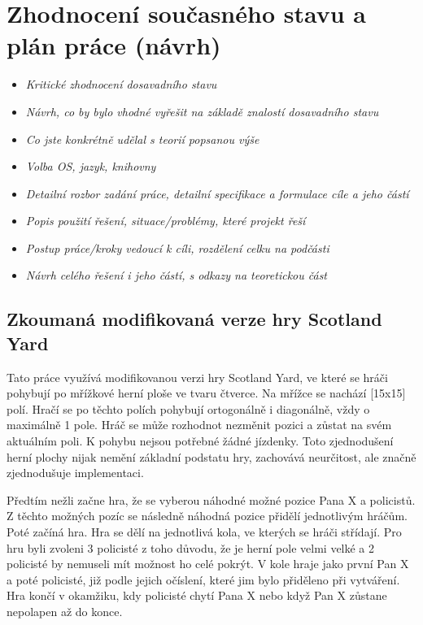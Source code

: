 \chapter{Zhodnocení současného stavu a plán práce (návrh)}
\label{ch:navrh}
\begin{itemize}
  \item \emph {Kritické zhodnocení dosavadního stavu}
  \item \emph {Návrh, co by bylo vhodné vyřešit na základě znalostí dosavadního stavu}
  \item \emph {Co jste konkrétně udělal s teorií popsanou výše}
  \item \emph {Volba OS, jazyk, knihovny}
  \item \emph {Detailní rozbor zadání práce, detailní specifikace a formulace cíle a jeho částí}
  \item \emph {Popis použití řešení, situace/problémy, které projekt řeší}
  \item \emph {Postup práce/kroky vedoucí k cíli, rozdělení celku na podčásti}
  \item \emph {Návrh celého řešení i jeho částí, s odkazy na teoretickou část}
\end{itemize}

\section*{Zkoumaná modifikovaná verze hry Scotland Yard}

Tato práce využívá modifikovanou verzi hry Scotland Yard, ve které se hráči pohybují po mřížkové herní ploše ve tvaru čtverce.
Na mřížce se nachází {\color{red}[15x15]} polí.
Hračí se po těchto polích pohybují ortogonálně i diagonálně, vždy o maximálně 1 pole.
Hráč se může rozhodnot nezměnit pozici a zůstat na svém aktuálním poli.
K pohybu nejsou potřebné žádné jízdenky.
Toto zjednodušení herní plochy nijak nemění základní podstatu hry, zachovává neurčitost, ale značně zjednodušuje implementaci.

Předtím nežli začne hra, že se vyberou náhodné možné pozice Pana X a policistů.
Z těchto možných pozíc se následně náhodná pozice přidělí jednotlivým hráčům.
Poté začíná hra.
Hra se dělí na jednotlivá kola, ve kterých se hráči střídají.
Pro hru byli zvoleni 3 policisté z toho důvodu, že je herní pole velmi velké a 2 policisté by nemuseli mít možnost ho celé pokrýt.
V kole hraje jako první Pan X a poté policisté, již podle jejich očíslení, které jim bylo přiděleno při vytváření.
Hra končí v okamžiku, kdy policisté chytí Pana X nebo když Pan X zůstane nepolapen až do konce.

